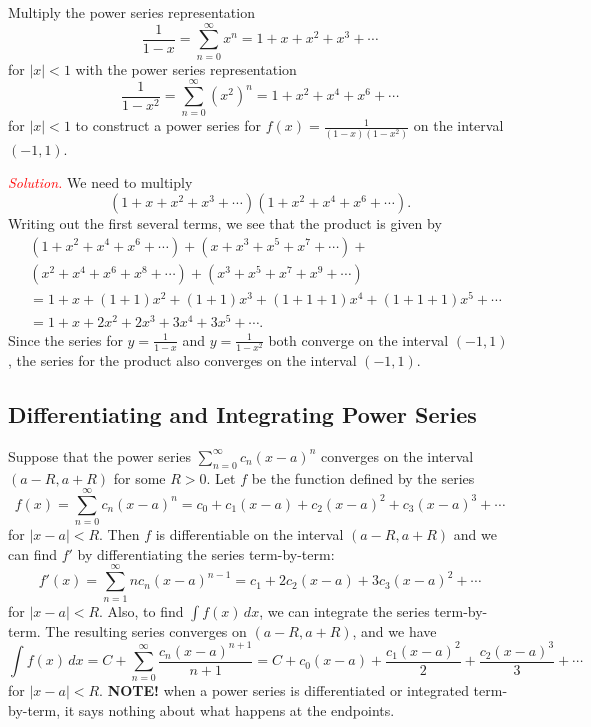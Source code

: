 \documentclass{report}
\begin{document}
    \bigbreak \noindent 
    \begin{exm}
        Multiply the power series representation
        \[
        \frac{1}{1 - x} = \sum_{n=0}^{\infty} x^n = 1 + x + x^2 + x^3 + \cdots
        \]
        for \( |x| < 1 \) with the power series representation
        \[
        \frac{1}{1 - x^2} = \sum_{n=0}^{\infty} (x^2)^n = 1 + x^2 + x^4 + x^6 + \cdots
        \]
        for \( |x| < 1 \) to construct a power series for \( f(x) = \frac{1}{(1 - x)(1 - x^2)} \) on the interval \( (-1, 1) \).
    \end{exm}
    \bigbreak \noindent 
    \textcolor{red}{\textit{Solution.}} 
    We need to multiply
    \[
    (1 + x + x^2 + x^3 + \cdots)(1 + x^2 + x^4 + x^6 + \cdots).
    \]
    Writing out the first several terms, we see that the product is given by
    \[
    \begin{aligned}
    &(1 + x^2 + x^4 + x^6 + \cdots) + (x + x^3 + x^5 + x^7 + \cdots) + \\
    &(x^2 + x^4 + x^6 + x^8 + \cdots) + (x^3 + x^5 + x^7 + x^9 + \cdots) \\
    &= 1 + x + (1 + 1)x^2 + (1 + 1)x^3 + (1 + 1 + 1)x^4 + (1 + 1 + 1)x^5 + \cdots \\
    &= 1 + x + 2x^2 + 2x^3 + 3x^4 + 3x^5 + \cdots.
    \end{aligned}
    \]
    Since the series for \( y = \frac{1}{1 - x} \) and \( y = \frac{1}{1 - x^2} \) both converge on the interval \( (-1, 1) \), the series for the product also converges on the interval \( (-1, 1) \).


    \pagebreak 
    \subsection*{Differentiating and Integrating Power Series}
    \bigbreak \noindent 
    \begin{thrmm}
         Suppose that the power series $\sum_{n=0}^{\infty} c_n (x - a)^n$ converges on the interval $(a - R, a + R)$ for some $R > 0$. Let $f$ be the function defined by the series
        \[
        f(x) = \sum_{n=0}^{\infty} c_n (x - a)^n = c_0 + c_1(x - a) + c_2(x - a)^2 + c_3(x - a)^3 + \cdots
        \]
        for $|x - a| < R$. Then $f$ is differentiable on the interval $(a - R, a + R)$ and we can find $f'$ by differentiating the series term-by-term:
        \[
        f'(x) = \sum_{n=1}^{\infty} n c_n (x - a)^{n-1} = c_1 + 2c_2(x - a) + 3c_3(x - a)^2 + \cdots
        \]
        for $|x - a| < R$. Also, to find $\int f(x) \, dx$, we can integrate the series term-by-term. The resulting series converges on $(a - R, a + R)$, and we have
        \[
        \int f(x) \, dx = C + \sum_{n=0}^{\infty} \frac{c_n (x - a)^{n+1}}{n+1} = C + c_0(x - a) + \frac{c_1(x - a)^2}{2} + \frac{c_2(x - a)^3}{3} + \cdots
        \]
        for $|x - a| < R$.
        \bigbreak \noindent 
        \textbf{NOTE!} when a power series is differentiated or integrated term-by-term, it says nothing about what happens at the endpoints.
    \end{thrmm}
\end{document}
